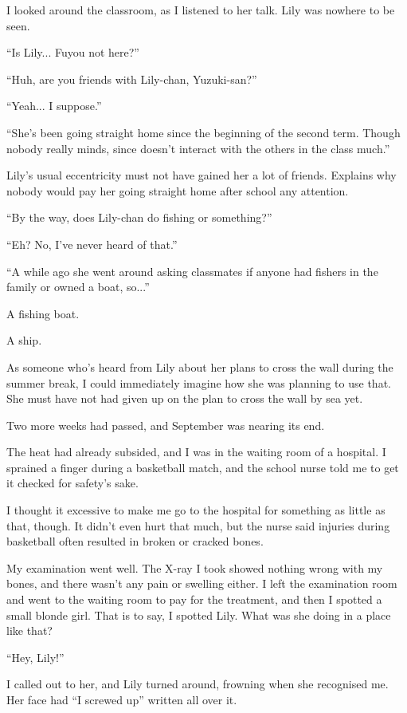 I looked around the classroom, as I listened to her talk. Lily was nowhere to be seen.

``Is Lily... Fuyou not here?''

``Huh, are you friends with Lily-chan, Yuzuki-san?''

``Yeah... I suppose.''

``She's been going straight home since the beginning of the second term. Though nobody really minds, since doesn't interact with the others in the class much.''

Lily's usual eccentricity must not have gained her a lot of friends. Explains why nobody would pay her going straight home after school any attention.

``By the way, does Lily-chan do fishing or something?''

``Eh? No, I've never heard of that.''

``A while ago she went around asking classmates if anyone had fishers in the family or owned a boat, so...''

A fishing boat.

A ship.

As someone who's heard from Lily about her plans to cross the wall during the summer break, I could immediately imagine how she was planning to use that. She must have not had given up on the plan to cross the wall by sea yet.

Two more weeks had passed, and September was nearing its end.

The heat had already subsided, and I was in the waiting room of a hospital. I sprained a finger during a basketball match, and the school nurse told me to get it checked for safety's sake.

I thought it excessive to make me go to the hospital for something as little as that, though. It didn't even hurt that much, but the nurse said injuries during basketball often resulted in broken or cracked bones.

My examination went well. The X-ray I took showed nothing wrong with my bones, and there wasn't any pain or swelling either. I left the examination room and went to the waiting room to pay for the treatment, and then I spotted a small blonde girl. That is to say, I spotted Lily. What was she doing in a place like that?

``Hey, Lily!''

I called out to her, and Lily turned around, frowning when she recognised me. Her face had ``I screwed up'' written all over it.

